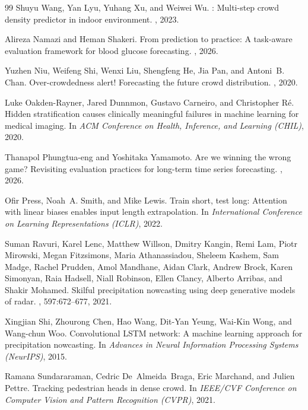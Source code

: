 \documentclass{article}
\begin{document}
{\begin{thebibliography}{99}
Shuyu Wang, Yan Lyu, Yuhang Xu, and Weiwei Wu.
: Multi-step crowd density predictor in indoor environment.
, 2023.

Alireza Namazi and Heman Shakeri.
\newblock From prediction to practice: A task-aware evaluation framework for
  blood glucose forecasting.
, 2026.

Yuzhen Niu, Weifeng Shi, Wenxi Liu, Shengfeng He, Jia Pan, and
  Antoni~B. Chan.
\newblock Over-crowdedness alert! {F}orecasting the future crowd distribution.
, 2020.

Luke Oakden-Rayner, Jared Dunnmon, Gustavo Carneiro, and Christopher R\'e.
\newblock Hidden stratification causes clinically meaningful failures in machine
  learning for medical imaging.
\newblock In {\em ACM Conference on Health, Inference, and Learning (CHIL)},
  2020.

Thanapol Phungtua-eng and Yoshitaka Yamamoto.
\newblock Are we winning the wrong game? {R}evisiting evaluation practices for
  long-term time series forecasting.
, 2026.

Ofir Press, Noah~A. Smith, and Mike Lewis.
\newblock Train short, test long: Attention with linear biases enables input
  length extrapolation.
\newblock In {\em International Conference on Learning Representations (ICLR)},
  2022.

Suman Ravuri, Karel Lenc, Matthew Willson, Dmitry Kangin, Remi Lam,
  Piotr Mirowski, Megan Fitzsimons, Maria Athanassiadou, Sheleem Kashem,
  Sam Madge, Rachel Prudden, Amol Mandhane, Aidan Clark, Andrew Brock,
  Karen Simonyan, Raia Hadsell, Niall Robinson, Ellen Clancy,
  Alberto Arribas, and Shakir Mohamed.
\newblock Skilful precipitation nowcasting using deep generative models of
  radar.
, 597:672--677, 2021.

Xingjian Shi, Zhourong Chen, Hao Wang, Dit-Yan Yeung, Wai-Kin Wong, and
  Wang-chun Woo.
\newblock Convolutional {LSTM} network: A machine learning approach for
  precipitation nowcasting.
\newblock In {\em Advances in Neural Information Processing Systems (NeurIPS)},
  2015.

Ramana Sundararaman, Cedric De~Almeida~Braga, Eric Marchand, and
  Julien Pettre.
\newblock Tracking pedestrian heads in dense crowd.
\newblock In {\em IEEE/CVF Conference on Computer Vision and Pattern Recognition
  (CVPR)}, 2021.


\end{thebibliography}}
\end{document}
